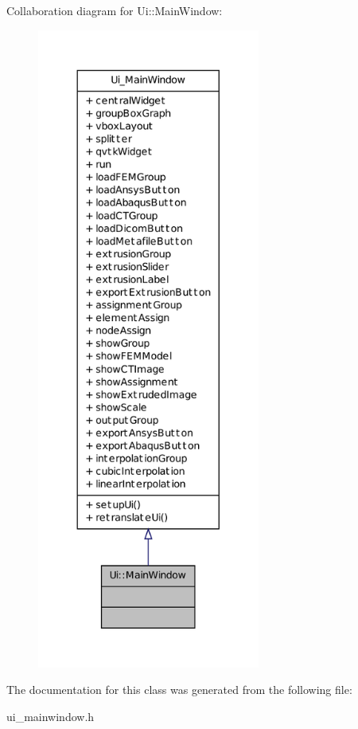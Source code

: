 Collaboration diagram for Ui::MainWindow:
\nopagebreak
\begin{figure}[H]
\begin{center}
\leavevmode
\includegraphics[height=600pt]{class_ui_1_1_main_window__coll__graph}
\end{center}
\end{figure}


The documentation for this class was generated from the following file:\begin{DoxyCompactItemize}
\item 
ui\_\-mainwindow.h\end{DoxyCompactItemize}
